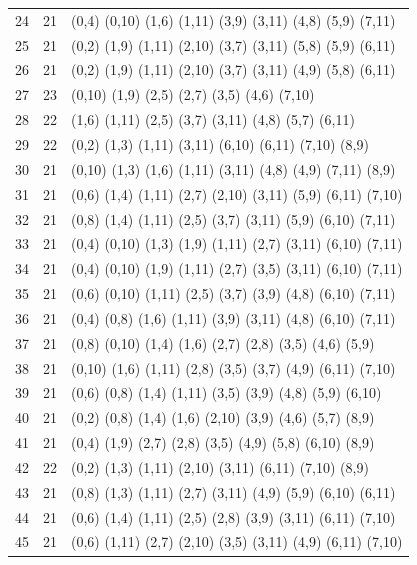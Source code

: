\begin{appendix}
{\begin{longtable}{lll}
24 & 21 & (0,4)   (0,10) (1,6)  (1,11)  (3,9)   (3,11)  (4,8)   (5,9)   (7,11)\\
25 & 21 & (0,2)   (1,9)  (1,11) (2,10)  (3,7)   (3,11)  (5,8)   (5,9)   (6,11)\\
26 & 21 & (0,2)   (1,9)  (1,11) (2,10)  (3,7)   (3,11)  (4,9)   (5,8)   (6,11)\\
27 & 23 & (0,10)  (1,9)  (2,5)  (2,7)   (3,5)   (4,6)   (7,10)      \\
28 & 22 & (1,6)   (1,11) (2,5)  (3,7)   (3,11)  (4,8)   (5,7)   (6,11)  \\
29 & 22 & (0,2)   (1,3)  (1,11) (3,11)  (6,10)  (6,11)  (7,10)  (8,9)   \\
30 & 21 & (0,10)  (1,3)  (1,6)  (1,11)  (3,11)  (4,8)   (4,9)   (7,11)  (8,9)\\
31 & 21 & (0,6)   (1,4)  (1,11) (2,7)   (2,10)  (3,11)  (5,9)   (6,11)  (7,10)\\
32 & 21 & (0,8)   (1,4)  (1,11) (2,5)   (3,7)   (3,11)  (5,9)   (6,10)  (7,11)\\
33 & 21 & (0,4)   (0,10) (1,3)  (1,9)   (1,11)  (2,7)   (3,11)  (6,10)  (7,11)\\
34 & 21 & (0,4)   (0,10) (1,9)  (1,11)  (2,7)   (3,5)   (3,11)  (6,10)  (7,11)\\
35 & 21 & (0,6)   (0,10) (1,11) (2,5)   (3,7)   (3,9)   (4,8)   (6,10)  (7,11)\\
36 & 21 & (0,4)   (0,8)  (1,6)  (1,11)  (3,9)   (3,11)  (4,8)   (6,10)  (7,11)\\
37 & 21 & (0,8)   (0,10) (1,4)  (1,6)   (2,7)   (2,8)   (3,5)   (4,6)   (5,9)\\
38 & 21 & (0,10)  (1,6)  (1,11) (2,8)   (3,5)   (3,7)   (4,9)   (6,11)  (7,10)\\
39 & 21 & (0,6)   (0,8)  (1,4)  (1,11)  (3,5)   (3,9)   (4,8)   (5,9)   (6,10)\\
40 & 21 & (0,2)   (0,8)  (1,4)  (1,6)   (2,10)  (3,9)   (4,6)   (5,7)   (8,9)\\
41 & 21 & (0,4)   (1,9)  (2,7)  (2,8)   (3,5)   (4,9)   (5,8)   (6,10)  (8,9)\\
42 & 22 & (0,2)   (1,3)  (1,11) (2,10)  (3,11)  (6,11)  (7,10)  (8,9)   \\
43 & 21 & (0,8)   (1,3)  (1,11) (2,7)   (3,11)  (4,9)   (5,9)   (6,10)  (6,11)\\
44 & 21 & (0,6)   (1,4)  (1,11) (2,5)   (2,8)   (3,9)   (3,11)  (6,11)  (7,10)\\
45 & 21 & (0,6)   (1,11) (2,7)  (2,10)  (3,5)   (3,11)  (4,9)   (6,11)  (7,10)\\

\end{longtable}}
\end{appendix}
